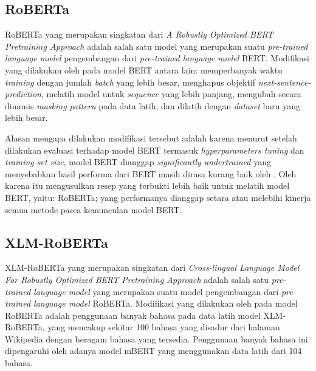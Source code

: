 \subsection{RoBERTa}
RoBERTa yang merupakan singkatan dari \emph{A Robustly Optimized BERT Pretraining Approach} adalah salah satu model yang merupakan suatu \emph{pre-trained language model} pengembangan dari \emph{pre-trained language model} BERT. Modifikasi yang dilakukan oleh \citet{liu2019roberta} pada model BERT antara lain: memperbanyak waktu \emph{training} dengan jumlah \emph{batch} yang lebih besar, menghapus objektif \emph{next-sentence-prediction}, melatih model untuk \emph{sequence} yang lebih panjang, mengubah secara dinamis \emph{masking pattern} pada data latih, dan dilatih dengan \emph{dataset} baru yang lebih besar. 

Alasan mengapa dilakukan modifikasi tersebut adalah karena menurut \citet{liu2019roberta} setelah dilakukan evaluasi terhadap model BERT termasuk \emph{hyperparameters tuning} dan \emph{training set size}, model BERT dianggap \emph{ significantly undertrained} yang menyebabkan hasil performa dari BERT masih dirasa kurang baik oleh \citeauthor{liu2019roberta}. Oleh karena itu \citet{liu2019roberta} mengusulkan resep yang terbukti lebih baik untuk melatih model BERT, yaitu: RoBERTa; yang performanya dianggap setara atau melebihi kinerja semua metode pasca kemunculan model BERT.

\subsection{XLM-RoBERTa}
XLM-RoBERTa yang merupakan singkatan dari \emph{Cross-lingual Language Model For Robustly Optimized BERT Pretraining Approach} adalah salah satu \emph{pre-trained language model} yang merupakan suatu model pengembangan dari \emph{pre-trained language model} RoBERTa. Modifikasi yang dilakukan oleh \citet{conneau2020unsupervised} pada model RoBERTa adalah penggunaan banyak bahasa pada data latih model XLM-RoBERTa, yang mencakup sekitar 100 bahasa yang disadur dari halaman Wikipedia dengan beragam bahasa yang tersedia. Penggunaan banyak bahasa ini dipengaruhi oleh adanya model mBERT yang menggunakan data latih dari 104 bahasa.

